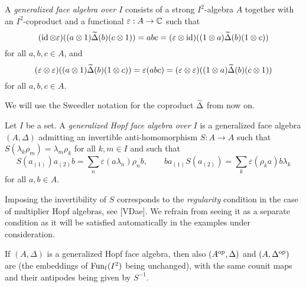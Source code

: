 \begin{Def} A \emph{generalized face algebra over $I$} consists of a
  strong $I^2$-algebra $A$ together with an $I^2$-coproduct and a
  functional $\varepsilon:A\rightarrow \mathbb{C}$ such that \[(\operatorname{id}\otimes
  \varepsilon)((a\otimes 1)\widetilde{\Delta}(b)(c\otimes 1)) = abc =
  (\varepsilon\otimes \operatorname{id})((1\otimes a)\widetilde{\Delta}(b)(1\otimes c))\] for
  all $a,b,c\in A$,
  and \begin{equation}\label{EqBoh}(\varepsilon\otimes
    \varepsilon)((a\otimes 1)\widetilde{\Delta}(b)(1\otimes c)) =
    \varepsilon(abc) = (\varepsilon\otimes \varepsilon)((1\otimes
    a)\widetilde{\Delta}(b)(c\otimes 1))\end{equation} for all $a,b,c\in
  A$.%
\end{Def}






We will use the Sweedler notation for the coproduct $\widetilde{\Delta}$ from now
on.

\begin{Def} Let $I$ be a set. A \emph{generalized Hopf face algebra
    over $I$} is a generalized face algebra $(A,\Delta)$ admitting an
  invertible anti-homomorphism $S:A \rightarrow A$ such that
  $S(\lambda_k\rho_m) = \lambda_m\rho_k$ for all $k,m\in I$ and such
  that \[S(a_{(1)})a_{(2)}b = \sum_n\varepsilon(a\lambda_n)\rho_nb,
  \qquad ba_{(1)}S(a_{(2)}) = \sum_k\varepsilon(\rho_ka)b\lambda_k\]
  for all $a,b\in A$.
\end{Def}

\begin{Rem} Imposing the invertibility of $S$ corresponds to the
  \emph{regularity} condition in the case of multiplier Hopf algebras,
  see [VDae]. We refrain from seeing it as a separate condition as it
  will be satisfied automatically in the examples under consideration.
\end{Rem}

\begin{Rem} If $(A,\Delta)$ is a generalized Hopf face algebra, then
  also $(A^{\operatorname{\mathrm{op}}},\Delta)$ and $(A,\Delta^{\operatorname{\mathrm{op}}})$ are (the embeddings
  of $\mathrm{Fun}_{\operatorname{\mathrm{f}}}(I^2)$ being unchanged), with the same counit maps and their
  antipodes being given by $S^{-1}$.

\end{Rem}

